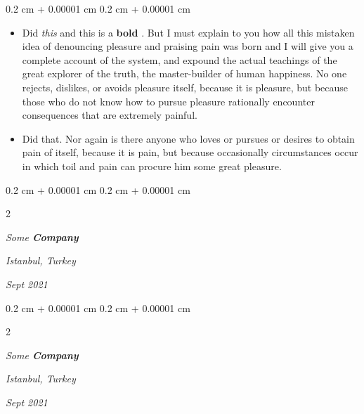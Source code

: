 \documentclass[10pt, letterpaper]{article}
\newenvironment{highlights}{
    \begin{itemize}[
        topsep=0.10 cm,
        parsep=0.10 cm,
        partopsep=0pt,
        itemsep=0pt,
        leftmargin=0.4 cm + 10pt
    ]
}{
    \end{itemize}
} %
\newenvironment{onecolentry}{
    \begin{adjustwidth}{
        0.2 cm + 0.00001 cm
    }{
        0.2 cm + 0.00001 cm
    }
}{
    \end{adjustwidth}
} %
\newenvironment{twocolentry}[2][]{
    \onecolentry
    \def\secondColumn{#2}
    \setcolumnwidth{\fill, 4.5 cm}
    \begin{paracol}{2}
}{
    \switchcolumn \raggedleft \secondColumn
    \end{paracol}
    \endonecolentry
} %
\let\hrefWithoutArrow\href
\renewcommand{\href}[2]{\hrefWithoutArrow{#1}{\ifthenelse{\equal{#2}{}}{ }{#2 }\raisebox{.15ex}{\footnotesize \faExternalLink*}}}
\begin{document}
        \vspace{0.10 cm}
        \begin{onecolentry}
            \begin{highlights}
                \item Did \textit{this} and this is a \textbf{bold} \href{https://example.com}{link}. But I must explain to you how all this mistaken idea of denouncing pleasure and praising pain was born and I will give you a complete account of the system, and expound the actual teachings of the great explorer of the truth, the master-builder of human happiness. No one rejects, dislikes, or avoids pleasure itself, because it is pleasure, but because those who do not know how to pursue pleasure rationally encounter consequences that are extremely painful.
                \item Did that. Nor again is there anyone who loves or pursues or desires to obtain pain of itself, because it is pain, but because occasionally circumstances occur in which toil and pain can procure him some great pleasure.
            \end{highlights}
        \end{onecolentry}


        \vspace{0.2 cm}

            \begin{twocolentry}{
        \textit{Istanbul, Turkey}

        \textit{Sept 2021}    }
                \textbf{}

                \textit{Some \textbf{Company}}
            \end{twocolentry}



        \vspace{0.2 cm}

            \begin{twocolentry}{
        \textit{Istanbul, Turkey}

        \textit{Sept 2021}    }
                \textbf{}

                \textit{Some \textbf{Company}}
            \end{twocolentry}
\end{document}
